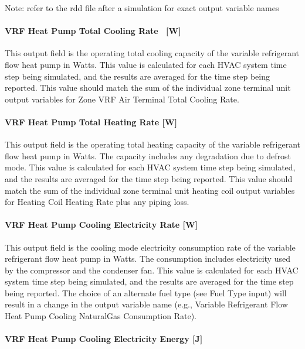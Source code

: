 Note: refer to the rdd file after a simulation for exact output variable names

\paragraph{VRF Heat Pump Total Cooling Rate ~{[}W{]}}\label{vrf-heat-pump-total-cooling-rate-w}

This output field is the operating total cooling capacity of the variable refrigerant flow heat pump in Watts. This value is calculated for each HVAC system time step being simulated, and the results are averaged for the time step being reported. This value should match the sum of the individual zone terminal unit output variables for Zone VRF Air Terminal Total Cooling Rate.

\paragraph{VRF Heat Pump Total Heating Rate {[}W{]}}\label{vrf-heat-pump-total-heating-rate-w}

This output field is the operating total heating capacity of the variable refrigerant flow heat pump in Watts. The capacity includes any degradation due to defrost mode. This value is calculated for each HVAC system time step being simulated, and the results are averaged for the time step being reported. This value should match the sum of the individual zone terminal unit heating coil output variables for Heating Coil Heating Rate plus any piping loss.

\paragraph{VRF Heat Pump Cooling Electricity Rate {[}W{]}}\label{vrf-heat-pump-cooling-electric-power-w}

This output field is the cooling mode electricity consumption rate of the variable refrigerant flow heat pump in Watts. The consumption includes electricity used by the compressor and the condenser fan. This value is calculated for each HVAC system time step being simulated, and the results are averaged for the time step being reported. The choice of an alternate fuel type (see Fuel Type input) will result in a change in the output variable name (e.g., Variable Refrigerant Flow Heat Pump Cooling NaturalGas Consumption Rate).

\paragraph{VRF Heat Pump Cooling Electricity Energy {[}J{]}}\label{vrf-heat-pump-cooling-electric-energy-j}

